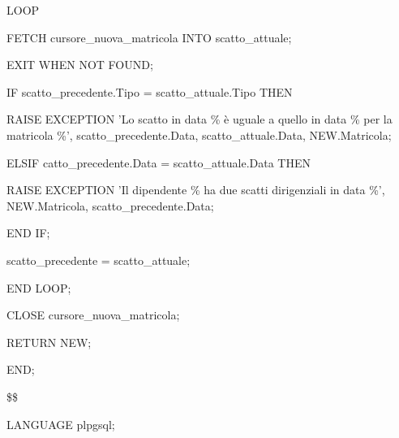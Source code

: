 \begin{flushleft}
\begin{description}
\begin{description}
                        \item LOOP
                        \begin{description}
                            \item FETCH cursore\_nuova\_matricola INTO scatto\_attuale;
                            \item EXIT WHEN NOT FOUND;
                            
                            \vspace{0.5cm}
                            
                            \item IF scatto\_precedente.Tipo = scatto\_attuale.Tipo THEN
                            \begin{description}
                                \item RAISE EXCEPTION 'Lo scatto in data \% è uguale a quello in data \% per la matricola \%', scatto\_precedente.Data, scatto\_attuale.Data, NEW.Matricola;
                            \end{description}

                            \item ELSIF catto\_precedente.Data = scatto\_attuale.Data THEN
                            \begin{description}
                                \item RAISE EXCEPTION 'Il dipendente \% ha due scatti dirigenziali in data \%', NEW.Matricola, scatto\_precedente.Data;
                            \end{description}
                            \item END IF;
                            
                            \vspace{0.5cm}
                            
                            \item scatto\_precedente = scatto\_attuale;
                        \end{description}
                        \item END LOOP;
                        \item CLOSE cursore\_nuova\_matricola;
                        \item RETURN NEW;
                    \end{description}
                    \item END;
                    \item \$\$
                    \item LANGUAGE plpgsql;
                \end{description}
            \end{flushleft}
        \normalfont

